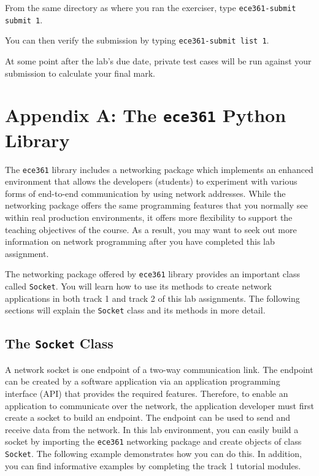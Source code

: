 \documentclass[11pt]{article}
\def\thelab{1}
\begin{document}
From the same directory as where you ran the exerciser, type \texttt{ece361-submit submit \thelab}.

You can then verify the submission by typing \texttt{ece361-submit list \thelab}.

At some point after the lab's due date, private test cases will be run against your submission to calculate your final mark.


\newpage
\section{Appendix A: The \texttt{ece361} Python Library}
\label{sec:appendix-ece361-lib}
The \texttt{ece361} library includes a networking package which implements an enhanced environment that allows the developers (students) to experiment with various forms of end-to-end communication by using network addresses. While the networking package offers the same programming features that you normally see within real production environments, it offers more flexibility to support the teaching objectives of the course. As a result, you may want to seek out more information on network programming after you have completed this lab assignment.

The networking package offered by \texttt{ece361} library provides an important class called \texttt{Socket}.
You will learn how to use its methods to create network applications in both track 1 and track 2 of this lab assignments.
The following sections will explain the \texttt{Socket} class and its methods in more detail.

\subsection{The \texttt{Socket} Class}
\label{subsec:socket-class}
A network socket is one endpoint of a two-way communication link. The endpoint can be created by a software application via an application programming interface (API) that provides the required features.
Therefore, to enable an application to communicate over the network, the application developer must first create a socket to build an endpoint.
The endpoint can be used to send and receive data from the network. In this lab environment, you can easily build a socket by importing the \texttt{ece361} networking package and create objects of class \texttt{Socket}.
The following example demonstrates how you can do this. In addition, you can find informative examples by completing the track 1 tutorial modules.
\end{document}
